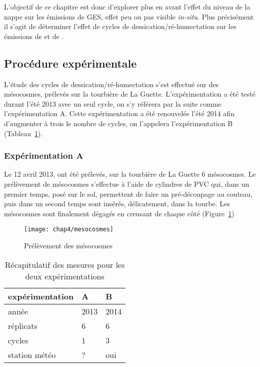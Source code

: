 L'objectif de ce chapitre est donc d'explorer plus en avant l'effet du niveau de la nappe sur les émissions de GES, effet peu ou pas visible \textit{in-situ}.
Plus précisément il s'agit de déterminer l'effet de cycles de dessication/ré-humectation sur les émissions de \coo et de \chh. 

\subsection{Procédure expérimentale}

L'étude des cycles de dessication/ré-humectation s'est effectué sur des mésocosmes, prélevés sur la tourbière de La Guette.
L'expérimentation a été testé durant l'été 2013 avec un seul cycle, on s'y référera par la suite comme l'expérimentation A.
Cette expérimentation a été renouvelée l'été 2014 afin d'augmenter à trois le nombre de cycles, on l'appelera l'expérimentation B (Tableau~\ref{table:recap_hm}).

\subsubsection{Expérimentation A}
Le 12 avril 2013, ont été prélevés, sur la tourbière de La Guette 6 mésocosmes.
Le prélèvement de mésocosmes s'effectue à l'aide de cylindres de PVC qui, dans un premier temps, posé sur le sol, permettent de faire un pré-découpage au couteau, puis dans un second temps sont insérés, délicatement, dans la tourbe. 
Les mésocosmes sont finalement dégagés en creusant de chaque côté (Figure~\ref{fig:mesophoto})

\begin{figure}
\centering
\texttt{[image: chap4/mesocosmes]}
\caption{Prélèvement des mésocosmes}
\label{fig:mesophoto}
\end{figure}


\begin{table}
\centering
\caption{Récapitulatif des mesures pour les deux expérimentations}
\label{table:recap_hm}
\begin{tabular}{lll}\toprule
expérimentation & A & B \\ \midrule
année & 2013 & 2014 \\
réplicats & 6 & 6 \\
cycles & 1 & 3 \\
station météo & ? & oui\\

\bottomrule
\end{tabular}
\end{table}


